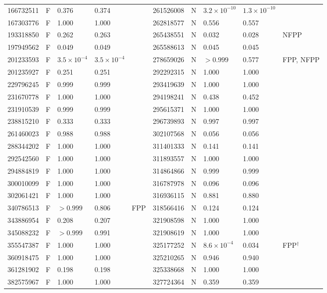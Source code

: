 \documentclass[11pt]{article}
\begin{document}
\begin{center}
\begin{longtable}{rllll@{\hspace{2.5em}}rllll}
166732511 & F & 0.376 & 0.374 &  & 261526008 & N & $3.2\times10^{-10}$ & $1.3\times10^{-10}$ &  \\
167303776 & F & 1.000 & 1.000 &  & 262818577 & N & 0.556 & 0.557 &  \\
193318850 & F & 0.262 & 0.263 &  & 265438551 & N & 0.032 & 0.028 & NFPP \\
197949562 & F & 0.049 & 0.049 &  & 265588613 & N & 0.045 & 0.045 &  \\
201233593 & F & $3.5\times10^{-4}$ & $3.5\times10^{-4}$ &  & 278659026 & N & $>0.999$ & 0.577 & FPP, NFPP \\
201235927 & F & 0.251 & 0.251 &  & 292292315 & N & 1.000 & 1.000 &  \\
229796245 & F & 0.999 & 0.999 &  & 293419639 & N & 1.000 & 1.000 &  \\
231670778 & F & 1.000 & 1.000 &  & 294198241 & N & 0.438 & 0.452 &  \\
231910539 & F & 0.999 & 0.999 &  & 295615371 & N & 1.000 & 1.000 &  \\
238815210 & F & 0.333 & 0.333 &  & 296739893 & N & 0.997 & 0.997 &  \\
261460023 & F & 0.988 & 0.988 &  & 302107568 & N & 0.056 & 0.056 &  \\
288344202 & F & 1.000 & 1.000 &  & 311401333 & N & 0.141 & 0.141 &  \\
292542560 & F & 1.000 & 1.000 &  & 311893557 & N & 1.000 & 1.000 &  \\
294884819 & F & 1.000 & 1.000 &  & 314864866 & N & 0.999 & 0.999 &  \\
300010099 & F & 1.000 & 1.000 &  & 316787978 & N & 0.096 & 0.096 &  \\
302061421 & F & 1.000 & 1.000 &  & 316936115 & N & 0.881 & 0.880 &  \\
340786513 & F & $>0.999$ & 0.806 & FPP & 318566416 & N & 0.124 & 0.124 &  \\
343886954 & F & 0.208 & 0.207 &  & 321908598 & N & 1.000 & 1.000 &  \\
345088232 & F & $>0.999$ & 0.991 &  & 321908619 & N & 1.000 & 1.000 &  \\
355547387 & F & 1.000 & 1.000 &  & 325177252 & N & $8.6\times10^{-4}$ & 0.034 & FPP$^{\dagger}$ \\
360918475 & F & 1.000 & 1.000 &  & 325210265 & N & 0.946 & 0.940 &  \\
361281902 & F & 0.198 & 0.198 &  & 325338668 & N & 1.000 & 1.000 &  \\
382575967 & F & 1.000 & 1.000 &  & 327724364 & N & 0.359 & 0.359 &  \\

\end{longtable}
\end{center}
\end{document}
